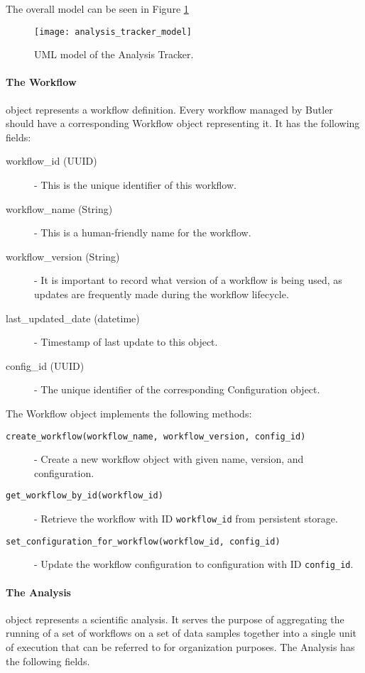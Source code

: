 The overall model can be seen in Figure \ref{fig:analysis_tracker_model}

\begin{figure}[H]
\texttt{[image: analysis\_tracker\_model]}
\centering
\caption {UML model of the Analysis Tracker.}
\label{fig:analysis_tracker_model}
\end{figure}

\paragraph{The Workflow} object represents a workflow definition. Every workflow managed by Butler should have a corresponding Workflow object representing it. It has the following fields:

\begin{description}
\item [workflow\_id (UUID)] - This is the unique identifier of this workflow.
\item [workflow\_name (String)] - This is a human-friendly name for the workflow.
\item [workflow\_version (String)] - It is important to record what version of a workflow is being used, as updates are frequently made during the workflow lifecycle.
\item [last\_updated\_date (datetime)] - Timestamp of last update to this object.
\item [config\_id (UUID)] - The unique identifier of the corresponding Configuration object.
\end{description}

The Workflow object implements the following methods:

\begin{description}
\item [\texttt{create_workflow(workflow_name, workflow_version, config_id)}] - Create a new workflow object with given name, version, and configuration.
\item [\texttt{get_workflow_by_id(workflow_id)}] - Retrieve the workflow with ID \texttt{workflow_id} from persistent storage.
\item [\texttt{set_configuration_for_workflow(workflow_id, config_id)}] - Update the workflow configuration to configuration with ID \texttt{config_id}.
\end{description}

\paragraph{The Analysis} object represents a scientific analysis. It serves the purpose of aggregating the running of a set of workflows on a set of data samples together into a single unit of execution that can be referred to for organization purposes. The Analysis has the following fields.


